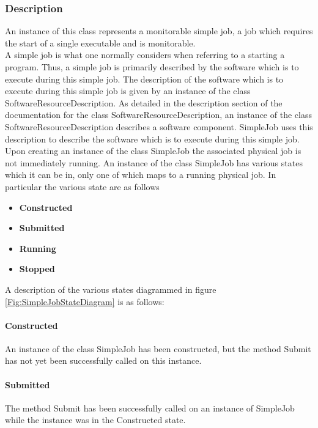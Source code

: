 \documentclass[$Date: 2003/06/26 19:29:31 $]{glabarticle}
\begin{document}
\subsubsection{Description}

An instance of this class represents a monitorable simple job, a job
which requires the start of a single executable and is monitorable. \\

A simple job is what one normally considers when referring to a
starting a program. Thus, a simple job is primarily described by the
software which is to execute during this simple job. The description
of the software which is to execute during this simple job is given by
an instance of the class SoftwareResourceDescription. As detailed in
the description section of the documentation for the class
SoftwareResourceDescription, an instance of the class
SoftwareResourceDescription describes a software component. SimpleJob
uses this description to describe the software which is to execute
during this simple job. \\

Upon creating an instance of the class SimpleJob the associated
physical job is not immediately running.  An instance of the class
SimpleJob has various states which it can be in, only one of which
maps to a running physical job. In particular the various state are as
follows

\begin{itemize}
  \item \textbf{Constructed}
  \item \textbf{Submitted}
  \item \textbf{Running}
  \item \textbf{Stopped}
\end{itemize}
A description of the various states diagrammed in figure \ref{Fig:SimpleJobStateDiagram} is as follows:

\paragraph{Constructed} An instance of the class SimpleJob has been constructed, but the method Submit
has not yet been successfully called on this instance.

\paragraph{Submitted} The method Submit has been successfully called on an instance of SimpleJob while
the instance was in the Constructed state.
\end{document}
